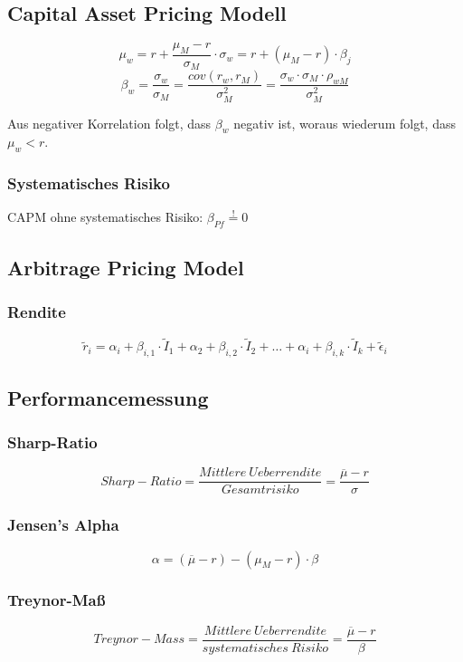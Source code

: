 \subsection{Capital Asset Pricing Modell}
\[\mu_w = r + \frac{\mu_M - r}{\sigma_M} \cdot \sigma_w = r + (\mu_M - r) \cdot \beta_j\]
\[\beta_w = \frac{\sigma_w}{\sigma_M} = \frac{cov(r_w, r_M)}{\sigma_M^2} = \frac{\sigma_w \cdot \sigma_M \cdot \rho_{wM}}{\sigma_M^2} \]

Aus negativer Korrelation folgt, dass \(\beta_w\) negativ ist, woraus wiederum folgt, dass \(\mu_w < r\).

\subsubsection{Systematisches Risiko}
CAPM ohne systematisches Risiko: \(\beta_{Pf} \stackrel{!}{=} 0\)


\subsection{Arbitrage Pricing Model}

\subsubsection{Rendite}
\[\tilde{r}_i = \alpha_i + \beta_{i,1} \cdot \tilde{I}_1 + \alpha_2 + \beta_{i,2} \cdot \tilde{I}_2 + \dots + \alpha_i + \beta_{i,k} \cdot \tilde{I}_k + \tilde{\epsilon}_i\]


\subsection{Performancemessung}

\subsubsection{Sharp-Ratio}
\[Sharp-Ratio = \frac{Mittlere~Ueberrendite}{Gesamtrisiko} = \frac{\overline{\mu} - r}{\sigma}\]

\subsubsection{Jensen's Alpha}
\[\alpha = (\overline{\mu} - r) - (\mu_M - r) \cdot \beta\]

\subsubsection{Treynor-Maß}
\[Treynor-Mass = \frac{Mittlere~Ueberrendite}{systematisches~Risiko} = \frac{\overline{\mu} - r}{\beta}\]


